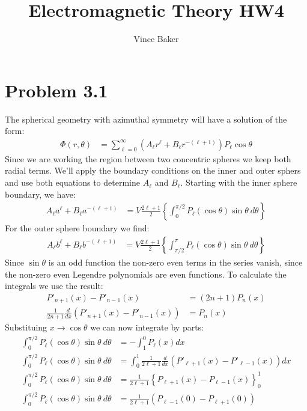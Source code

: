 \documentclass[a4paper,11pt]{article}
\title{Electromagnetic Theory HW4}
\author{Vince Baker}
\numberwithin{equation}{section}
\newcommand{\lrb}[1]{\left\{{#1}\right\}}
\begin{document}
\maketitle

\section{Problem 3.1}
The spherical geometry with azimuthal symmetry will have a solution of the form:
\begin{align}
 \Phi(r,\theta) &= \sum_{\ell=0}^\infty (A_\ell r^\ell+B_\ell r^{-(\ell+1)})P_\ell \cos{\theta}
\end{align}
Since we are working the region between two concentric spheres we keep both radial terms.
We'll apply the boundary conditions on the inner and outer sphers and use both equations to determine $A_\ell$ and $B_\ell$.
Starting with the inner sphere boundary, we have:
\begin{align}
 A_\ell a^\ell + B_\ell a^{-(\ell+1)} &= V\frac{2\ell+1}{2} \lrb{\int_0^{\pi/2} P_\ell(\cos{\theta})\sin\theta\ d\theta}
\end{align}
For the outer sphere boundary we find:
\begin{align}
 A_\ell b^\ell + B_\ell b^{-(\ell+1)} &= V\frac{2\ell+1}{2} \lrb{\int_{\pi/2}^{\pi} P_\ell(\cos{\theta})\sin\theta\ d\theta}
\end{align}
Since $\sin\theta$ is an odd function the non-zero even terms in the series vanish, since the non-zero even Legendre polynomials are even functions.
To calculate the integrals we use the result:
\begin{align}
 P'_{n+1}(x)-P'_{n-1}(x) &= (2n+1)P_n(x)\\
 \frac{1}{2n+1}\frac{d}{dx}(P'_{n+1}(x)-P'_{n-1}(x)) &= P_n(x)
\end{align}
Substituing $x\rightarrow\cos\theta$ we can now integrate by parts:
\begin{align}
 \int_0^{\pi/2} P_\ell(\cos{\theta})\sin\theta\ d\theta &= -\int_1^0 P_\ell(x) dx\\
 \int_0^{\pi/2} P_\ell(\cos{\theta})\sin\theta\ d\theta &= \int_0^1 \frac{1}{2\ell+1}\frac{d}{dx}(P'_{\ell+1}(x)-P'_{\ell-1}(x)) dx\\
 \int_0^{\pi/2} P_\ell(\cos{\theta})\sin\theta\ d\theta &= \frac{1}{2\ell+1}\lrb{P_{\ell+1}(x)-P_{\ell-1}(x)}_0^1\\
 \int_0^{\pi/2} P_\ell(\cos{\theta})\sin\theta\ d\theta &= \frac{1}{2\ell+1}(P_{\ell-1}(0)-P_{\ell+1}(0))
\end{align}
\end{document}
